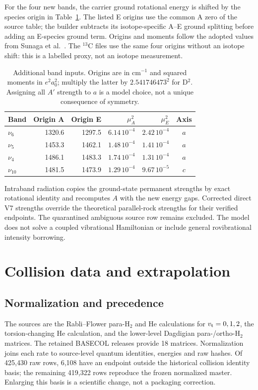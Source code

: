\documentclass[11pt,a4paper]{article}
\newcommand{\vt}{v_{\rm t}}
\begin{document}
For the four new bands, the carrier ground rotational energy is shifted by
the species origin in Table~\ref{tab:bands}. The listed E origins use the
common A zero of the source table; the builder subtracts its isotope-specific
A--E ground splitting before adding an E-species ground term. Origins and
moments follow the adopted values from Sunaga et al.~\cite{Sunaga_2026}.
The $^{13}$C files use the same four origins without an isotope shift: this
is a labelled proxy, not an isotope measurement.

\begin{table}[ht]
\centering\small
\caption{Additional band inputs. Origins are in cm$^{-1}$ and squared moments
in $e^2a_0^2$; multiply the latter by $2.541746473^2$ for D$^2$. Assigning
all $A'$ strength to $a$ is a model choice, not a unique consequence of symmetry.}
\label{tab:bands}
\begin{tabular}{lrrrrc}
\toprule Band & Origin A & Origin E & $\mu_A^2$ & $\mu_E^2$ & Axis\\\midrule
$\nu_6$ &1320.6&1297.5&$6.14\,10^{-4}$&$2.42\,10^{-4}$&$a$\\
$\nu_5$ &1453.3&1462.1&$1.48\,10^{-4}$&$1.41\,10^{-4}$&$a$\\
$\nu_4$ &1486.1&1483.3&$1.74\,10^{-4}$&$1.31\,10^{-4}$&$a$\\
$\nu_{10}$ &1481.5&1473.9&$1.29\,10^{-4}$&$9.67\,10^{-5}$&$c$\\\bottomrule
\end{tabular}
\end{table}

Intraband radiation copies the ground-state permanent strengths by exact
rotational identity and recomputes $A$ with the new energy gaps. Corrected
direct V7 strengths override the theoretical parallel-rock strengths for
their verified endpoints. The quarantined ambiguous source row remains
excluded. The model does not solve a coupled vibrational Hamiltonian or
include general rovibrational intensity borrowing.

\section{Collision data and extrapolation}
\subsection{Normalization and precedence}
The sources are the Rabli--Flower para-H$_2$ and He calculations for
$\vt=0,1,2$\cite{RabliFlower2010H2,RabliFlower2010He}, the torsion-changing
He calculation\cite{RabliFlower2011}, and the lower-level Dagdigian
para-/ortho-H$_2$ matrices\cite{Dagdigian2024}. The retained BASECOL releases
provide 18 matrices. Normalization joins each rate to source-level quantum
identities, energies and raw hashes. Of 425,430 raw rows, 6,108 have an endpoint
outside the historical collision identity basis; the remaining 419,322 rows
reproduce the frozen normalized master. Enlarging this basis is a scientific
change, not a packaging correction.
\end{document}
